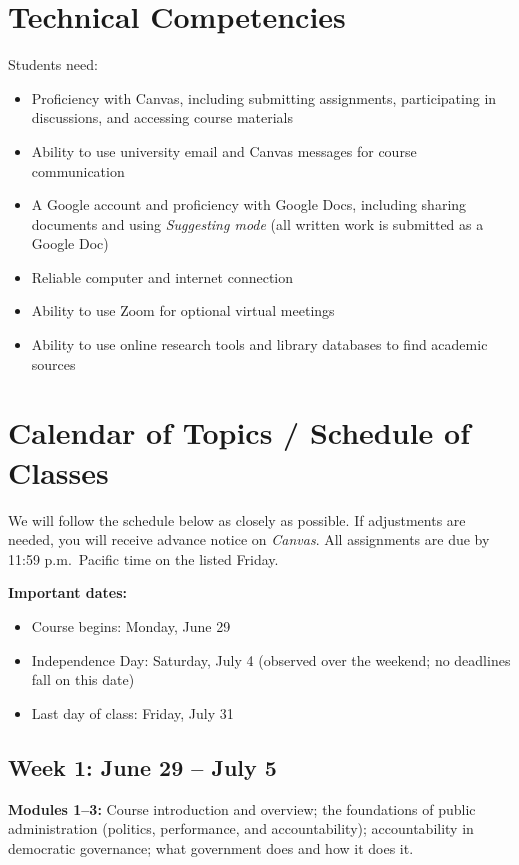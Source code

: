 \documentclass[12pt]{article}
\begin{document}
\section*{Technical Competencies}
Students need:
\begin{itemize}
\item Proficiency with Canvas, including submitting assignments, participating in discussions, and accessing course materials
\item Ability to use university email and Canvas messages for course communication
\item A Google account and proficiency with Google Docs, including sharing documents and using \emph{Suggesting mode} (all written work is submitted as a Google Doc)
\item Reliable computer and internet connection
\item Ability to use Zoom for optional virtual meetings
\item Ability to use online research tools and library databases to find academic sources
\end{itemize}

\section*{Calendar of Topics / Schedule of Classes}

We will follow the schedule below as closely as possible. If adjustments are needed, you will receive advance notice on \emph{Canvas}. All assignments are due by 11:59 p.m.\ Pacific time on the listed Friday.

\vspace{0.5em}
\noindent \textbf{Important dates:}
\begin{itemize}
    \item Course begins: Monday, June 29
    \item Independence Day: Saturday, July 4 (observed over the weekend; no deadlines fall on this date)
    \item Last day of class: Friday, July 31
\end{itemize}

\bigskip

\subsection*{Week 1: June 29 -- July 5}
\noindent \textbf{Modules 1--3:} Course introduction and overview; the foundations of public administration (politics, performance, and accountability); accountability in democratic governance; what government does and how it does it.
\end{document}
